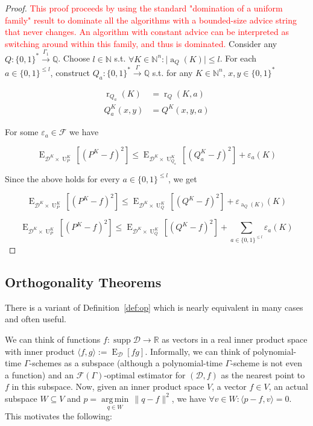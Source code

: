 \documentclass[11pt]{article}
\numberwithin{equation}{section}
\theoremstyle{definition}
\theoremstyle{plain}
\newcommand{\Bool}{\{0,1\}}
\newcommand{\Words}{{\Bool^*}}
\DeclareMathOperator{\Supp}{supp}
\DeclareMathOperator{\E}{E}
\DeclareMathOperator{\R}{r}
\DeclareMathOperator{\A}{a}
\DeclareMathOperator{\Un}{U}
\newcommand{\Argmin}[1]{\underset{#1}{\operatorname{arg\,min}}\,}
\newcommand{\Nats}{\mathbb{N}}
\newcommand{\Rats}{\mathbb{Q}}
\newcommand{\Reals}{\mathbb{R}}
\newcommand{\Abs}[1]{\lvert #1 \rvert}
\newcommand{\Norm}[1]{\lVert #1 \rVert}
\newcommand{\Chev}[1]{\langle #1 \rangle}
\newcommand{\Dist}{\mathcal{D}}
\newcommand{\Fall}{\mathcal{F}}
\newcommand{\EG}{\Fall(\Gamma)}
\newcommand{\Scheme}{\xrightarrow{\Gamma}}
\begin{document}
\begin{proof}
\textcolor{red}{This proof proceeds by using the standard "domination of a uniform family" result to dominate all the algorithms with a bounded-size advice string that never changes. An algorithm with constant advice can be interpreted as switching around within this family, and thus is dominated.}
Consider any ${Q: \Words \xrightarrow{\Gamma_1} \Rats}$. Choose ${l \in \Nats}$ s.t. ${\forall K \in \Nats^n: \Abs{\A_Q(K)} \leq l}$. For each\\ $a \in \Bool^{\leq l}$, construct ${Q_a: \Words \Scheme \Rats}$ s.t. for any ${K \in \Nats^n}$, ${x,y \in \Words}$

\begin{align*}
\R_{Q_a}(K) &= \R_Q(K,a) \\
Q_a^K(x,y) &= Q^K(x,y,a) 
\end{align*}

For some ${\varepsilon_a \in \Fall}$ we have

\[\E_{\Dist^{K} \times \Un_P^{K}}[(P^{K} - f)^2] \leq \E_{\Dist^{K} \times \Un_{Q_a}^{K}}[(Q_a^{K} - f)^2] + \varepsilon_a(K)\]

Since the above holds for every ${a \in \Bool^{\leq l}}$, we get 

\[\E_{\Dist^{K} \times \Un_P^{K}}[(P^{K} - f)^2] \leq \E_{\Dist^{K} \times \Un_{Q}^{K}}[(Q^{K} - f)^2] + \varepsilon_{\A_Q(K)}(K)\]

\[\E_{\Dist^{K} \times \Un_P^{K}}[(P^{K} - f)^2] \leq \E_{\Dist^{K} \times \Un_{Q}^{K}}[(Q^{K} - f)^2] + \sum_{a \in \Bool^{\leq l}} \varepsilon_a(K)\]

\end{proof}

\subsection{Orthogonality Theorems}

There is a variant of Definition~\ref{def:op} which is nearly equivalent in many cases and often useful.

We can think of functions $f: \Supp \Dist \rightarrow \Reals$ as vectors in a real inner product space with inner product $\Chev{f,g}:=\E_\Dist[fg]$. Informally, we can think of polynomial-time $\Gamma$-schemes as a subspace (although a polynomial-time $\Gamma$-scheme is not even a function) and an $\EG$-optimal estimator for $(\Dist,f)$ as the nearest point to $f$ in this subspace. Now, given an inner product space $V$, a vector $f \in V$, an actual subspace $W \subseteq V$ and $p = \Argmin{q \in W} \Norm{q - f}^2$, we have $\forall v \in W: \Chev{p-f,v}=0$. This motivates the following:
\end{document}
